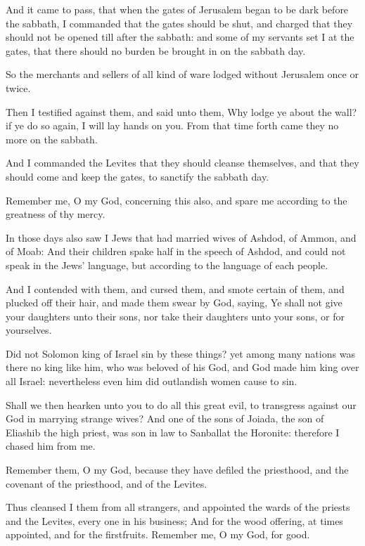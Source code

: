 \Verse And it came to pass, that when the gates of Jerusalem began to be dark before the sabbath, I commanded that the gates should be shut, and charged that they should not be opened till after the sabbath: and some of my servants set I at the gates, that there should no burden be brought in on the sabbath day.

\Verse So the merchants and sellers of all kind of ware lodged without Jerusalem once or twice.

\Verse Then I testified against them, and said unto them, Why lodge ye about the wall? if ye do so again, I will lay hands on you. From that time forth came they no more on the sabbath.

\Verse And I commanded the Levites that they should cleanse themselves, and that they should come and keep the gates, to sanctify the sabbath day.

Remember me, O my God, concerning this also, and spare me according to the greatness of thy mercy.

\Verse In those days also saw I Jews that had married wives of Ashdod, of Ammon, and of Moab: \Verse And their children spake half in the speech of Ashdod, and could not speak in the Jews' language, but according to the language of each people.

\Verse And I contended with them, and cursed them, and smote certain of them, and plucked off their hair, and made them swear by God, saying, Ye shall not give your daughters unto their sons, nor take their daughters unto your sons, or for yourselves.

\Verse Did not Solomon king of Israel sin by these things? yet among many nations was there no king like him, who was beloved of his God, and God made him king over all Israel: nevertheless even him did outlandish women cause to sin.

\Verse Shall we then hearken unto you to do all this great evil, to transgress against our God in marrying strange wives?  \Verse And one of the sons of Joiada, the son of Eliashib the high priest, was son in law to Sanballat the Horonite: therefore I chased him from me.

\Verse Remember them, O my God, because they have defiled the priesthood, and the covenant of the priesthood, and of the Levites.

\Verse Thus cleansed I them from all strangers, and appointed the wards of the priests and the Levites, every one in his business; \Verse And for the wood offering, at times appointed, and for the firstfruits.  Remember me, O my God, for good.

